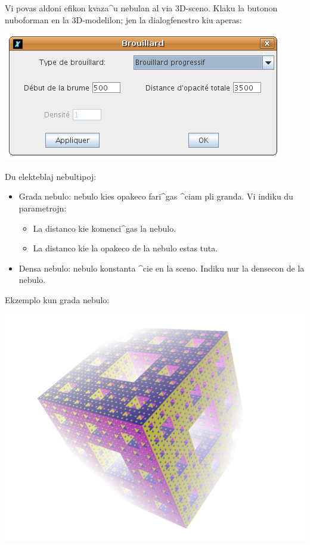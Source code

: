 Vi povas aldoni efikon kvaza^u nebulan al via 3D-sceno.  Klaku la
butonon nuboforman en la 3D-modelilon; jen la dialogfenestro kiu
aperas:
\begin{center}
 \includegraphics*[scale=0.6]{bildoj/CaptureFog.png}
\end{center}
Du elekteblaj nebultipoj:
\begin{itemize}
\item Grada nebulo: nebulo kies opakeco fari^gas ^ciam pli granda.  Vi
  indiku du parametrojn:
  \begin{itemize}
  \item La distanco kie komenci^gas la nebulo.
  \item La distanco kie la opakeco de la nebulo estas tuta.
  \end{itemize}
\item Densa nebulo: nebulo konstanta ^cie en la sceno.  Indiku nur
  la densecon de la nebulo.
\end{itemize}
\vspace*{0.2cm}
Ekzemplo kun grada nebulo:
\begin{center}
 \includegraphics*[scale=0.4]{bildoj/example-fog.png}
\end{center}
